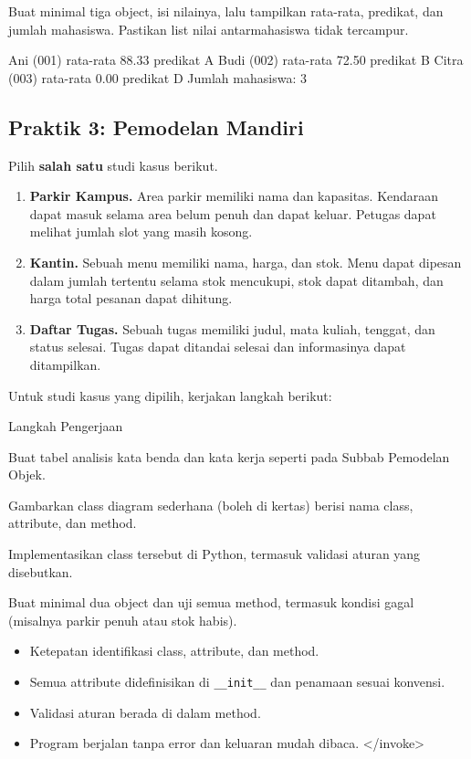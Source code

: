 Buat minimal tiga object, isi nilainya, lalu tampilkan rata-rata, predikat, dan jumlah mahasiswa. Pastikan list nilai antarmahasiswa tidak tercampur.

\begin{keluaran}
Ani   (001) rata-rata 88.33 predikat A
Budi  (002) rata-rata 72.50 predikat B
Citra (003) rata-rata 0.00 predikat D
Jumlah mahasiswa: 3
\end{keluaran}

\subsection{Praktik 3: Pemodelan Mandiri}

Pilih \textbf{salah satu} studi kasus berikut.

\begin{enumerate}
  \item \textbf{Parkir Kampus.} Area parkir memiliki nama dan kapasitas. Kendaraan dapat masuk selama area belum penuh dan dapat keluar. Petugas dapat melihat jumlah slot yang masih kosong.
  \item \textbf{Kantin.} Sebuah menu memiliki nama, harga, dan stok. Menu dapat dipesan dalam jumlah tertentu selama stok mencukupi, stok dapat ditambah, dan harga total pesanan dapat dihitung.
  \item \textbf{Daftar Tugas.} Sebuah tugas memiliki judul, mata kuliah, tenggat, dan status selesai. Tugas dapat ditandai selesai dan informasinya dapat ditampilkan.
\end{enumerate}

Untuk studi kasus yang dipilih, kerjakan langkah berikut:

\begin{langkah}{Langkah Pengerjaan}
  \item Buat tabel analisis kata benda dan kata kerja seperti pada Subbab Pemodelan Objek.
  \item Gambarkan class diagram sederhana (boleh di kertas) berisi nama class, attribute, dan method.
  \item Implementasikan class tersebut di Python, termasuk validasi aturan yang disebutkan.
  \item Buat minimal dua object dan uji semua method, termasuk kondisi gagal (misalnya parkir penuh atau stok habis).
\end{langkah}

\begin{penting}
\begin{itemize}
  \item Ketepatan identifikasi class, attribute, dan method.
  \item Semua attribute didefinisikan di \texttt{\_\_init\_\_} dan penamaan sesuai konvensi.
  \item Validasi aturan berada di dalam method.
  \item Program berjalan tanpa error dan keluaran mudah dibaca.
</invoke>
\end{itemize}
\end{penting}
